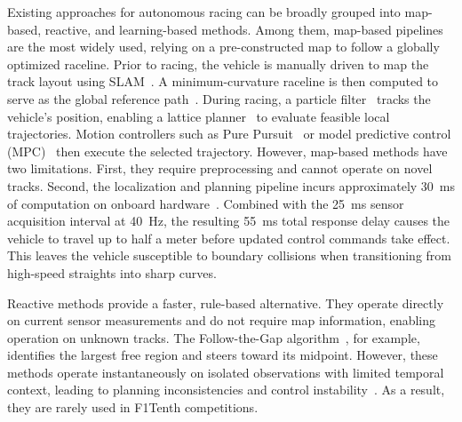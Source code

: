 \documentclass[letterpaper,10 pt,conference]{ieeeconf}
\begin{document}
Existing approaches for autonomous racing can be broadly grouped into map-based, reactive, and learning-based methods.
Among them, map-based pipelines are the most widely used, relying on a pre-constructed map to follow a globally optimized raceline.
Prior to racing, the vehicle is manually driven to map the track layout using SLAM~\cite{Macenski2021}.
A minimum-curvature raceline is then computed to serve as the global reference path~\cite{Heilmeier02102020}.
During racing, a particle filter~\cite{walsh2017cddt} tracks the vehicle's position, enabling a lattice planner~\cite{Pivtoraiko-2009-10176} to evaluate feasible local trajectories.
Motion controllers such as Pure Pursuit~\cite{coulter1992implementation} or model predictive control (MPC)~\cite{falcone2007predictive} then execute the selected trajectory.
However, map-based methods have two limitations.
First, they require preprocessing and cannot operate on novel tracks.
Second, the localization and planning pipeline incurs approximately 30~ms of computation on onboard hardware~\cite{zang2023localinn,muzzini2024gpu}.
Combined with the 25~ms sensor acquisition interval at 40~Hz, the resulting 55~ms total response delay causes the vehicle to travel up to half a meter before updated control commands take effect.
This leaves the vehicle susceptible to boundary collisions when transitioning from high-speed straights into sharp curves.

Reactive methods provide a faster, rule-based alternative. They operate directly on current sensor measurements and do not require map information, enabling operation on unknown tracks. The Follow-the-Gap algorithm~\cite{SEZER20121123}, for example, identifies the largest free region and steers toward its midpoint. However, these methods operate instantaneously on isolated observations with limited temporal context, leading to planning inconsistencies and control instability~\cite{hossain2022local}. As a result, they are rarely used in F1Tenth competitions.
\end{document}
